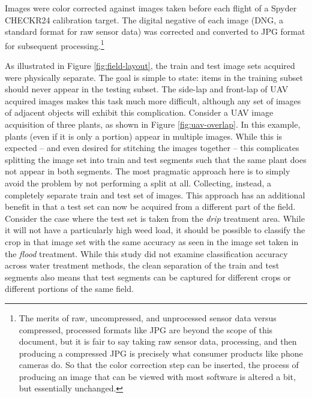 \documentclass[letterpaper]{article}
\begin{document}
{Images were color corrected against images taken before each flight of a Spyder CHECKR24 calibration target. The digital negative of each image (DNG, a standard format for raw sensor data) was corrected and converted to JPG format for subsequent processing.\footnote{The merits of raw, uncompressed, and unprocessed sensor data versus compressed, processed formats like JPG are beyond the scope of this document, but it is fair to say taking raw sensor data, processing, and then producing a compressed JPG is precisely what consumer products like phone cameras do. So that the color correction step can be inserted, the process of producing an image that can be viewed with most software is altered a bit, but essentially unchanged.}

As illustrated in Figure \ref{fig:field-layout}, the train and test image sets acquired were physically separate. The goal is simple to state: items in the training subset should never appear in the testing subset. The side-lap and front-lap of UAV acquired images makes this task much more difficult, although any set of images of adjacent objects will exhibit this complication. Consider a UAV image acquisition of three plants, as shown in Figure \ref{fig:uav-overlap}. In this example, plants (even if it is only a portion) appear in multiple images. While this is expected -- and even desired for stitching the images together -- this complicates splitting the image set into train and test segments such that the same plant does not appear in both segments. The most pragmatic approach here is to simply avoid the problem by not performing a split at all. Collecting, instead, a completely separate train and test set of images. This approach has an additional benefit in that a test set can now be acquired from a different part of the field. Consider the case where the test set is taken from the \textit{drip} treatment area. While it will not have a particularly high weed load, it should be possible to classify the crop in that image set with the same accuracy as seen in the image set taken in the \textit{flood} treatment. While this study did not examine classification accuracy across water treatment methods, the clean separation of the train and test segments also means that test segments can be captured for different crops or different portions of the same field.

}
\end{document}

